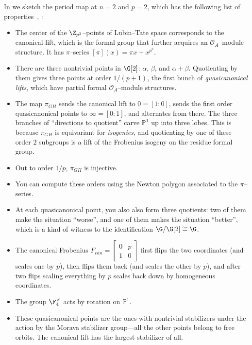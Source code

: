 \begin{remark}
In  we sketch the period map at \(n = 2\) and \(p = 2\), which has the following list of properties~\cite[Appendix 25]{HopkinsGrossEquivVBs}, \cite{Yu}:
\begin{itemize}
\item The center of the \(\Z_{p^2}\)--points of Lubin--Tate space corresponds to the canonical lift, which is the formal group that further acquires an \(\mathcal O_A\)--module structure.  It has \(\pi\)--series \([\pi](x) = \pi x + x^{p^2}\).
\item There are three nontrivial points in \(\G[2]\): \(\alpha\), \(\beta\), and \(\alpha + \beta\).  Quotienting by them gives three points at order \(1/(p+1)\), the first bunch of \textit{quasicanonical lifts}, which have partial formal \(\mathcal O_A\)--module structures.
\item The map \(\pi_{GH}\) sends the canonical lift to \(0 = [1:0]\), sends the first order quasicanonical points to \(\infty = [0:1]\), and alternates from there.  The three branches of ``directions to quotient'' carve \(\mathbb P^1\) up into three lobes.  This is because \(\pi_{GH}\) is equivariant for \textit{isogenies}, and quotienting by one of these order \(2\) subgroups is a lift of the Frobenius isogeny on the residue formal group.
\item Out to order \(1/p\), \(\pi_{GH}\) is injective.
\item You can compute these orders using the Newton polygon associated to the \(\pi\)--series.
\item At each quasicanonical point, you also also form three quotients: two of them make the situation ``worse'', and one of them makes the situation ``better'', which is a kind of witness to the identification \(\G / \G[2] \cong \G\).
\item The canonical Frobenius \(F_{can} = \left[ \begin{array}{cc} 0 & p \\ 1 & 0 \end{array} \right]\) first flips the two coordinates (and scales one by \(p\)), then flips them back (and scales the other by \(p\)), and after two flips scaling everything by \(p\) scales back down by homogeneous coordinates.
\item The group \(\F_4^\times\) acts by rotation on \(\mathbb P^1\).
\item These quasicanonical points are the ones with nontrivial stabilizers under the action by the Morava stabilizer group---all the other points belong to free orbits.  The canonical lift has the largest stabilizer of all.
\end{itemize}
\end{remark}

